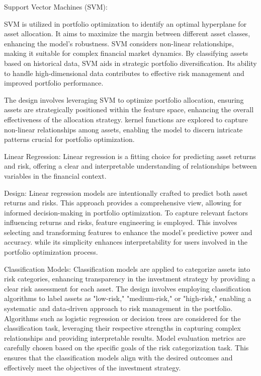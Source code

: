 \documentclass[conference]{IEEEtran}
\begin{document}
Support Vector Machines (SVM):

SVM is utilized in portfolio optimization to identify an optimal hyperplane for asset allocation. It aims to maximize the margin between different asset classes, enhancing the model's robustness. SVM considers non-linear relationships, making it suitable for complex financial market dynamics. By classifying assets based on historical data, SVM aids in strategic portfolio diversification. Its ability to handle high-dimensional data contributes to effective risk management and improved portfolio performance. 

The design involves leveraging SVM to optimize portfolio allocation, ensuring assets are strategically positioned within the feature space, enhancing the overall effectiveness of the allocation strategy. kernel functions are explored to capture non-linear relationships among assets, enabling the model to discern intricate patterns crucial for portfolio optimization.

Linear Regression:
Linear regression is a fitting choice for predicting asset returns and risk, offering a clear and interpretable understanding of relationships between variables in the financial context.

Design: Linear regression models are intentionally crafted to predict both asset returns and risks. This approach provides a comprehensive view, allowing for informed decision-making in portfolio optimization. To capture relevant factors influencing returns and risks, feature engineering is employed. This involves selecting and transforming features to enhance the model's predictive power and accuracy. while its simplicity enhances interpretability for users involved in the portfolio optimization process.

Classification Models:
Classification models are applied to categorize assets into risk categories, enhancing transparency in the investment strategy by providing a clear risk assessment for each asset. The design involves employing classification algorithms to label assets as "low-risk," "medium-risk," or "high-risk," enabling a systematic and data-driven approach to risk management in the portfolio. Algorithms such as logistic regression or decision trees are considered for the classification task, leveraging their respective strengths in capturing complex relationships and providing interpretable results. Model evaluation metrics are carefully chosen based on the specific goals of the risk categorization task. This ensures that the classification models align with the desired outcomes and effectively meet the objectives of the investment strategy.
\end{document}
